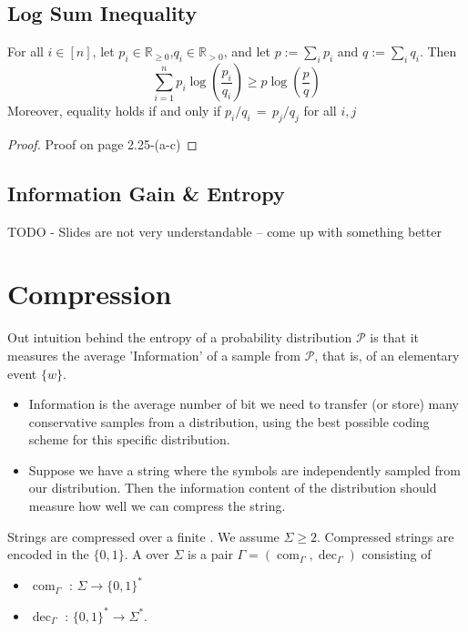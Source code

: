 \subsection{Log Sum Inequality}
For all $ i \in[n]$, let $ p_{i} \in \mathbb{R}_{ \geq 0}$,$ q_{i} \in \mathbb{R}_{>0}$, and let $ p :=\sum_{i} p_{i} $ and $q :=\sum_{i} q_{i}$. Then 
\begin{equation*}
\sum_{i=1}^{n} p_{i} \log (\frac{p_{i}}{q_{i}}) \geq p \log (\frac{p}{q})
\end{equation*}
Moreover, equality holds if and only if $p_i/q_i \, = \, p_j/q_j$ for all $i,j$
\begin{proof}
	Proof on page 2.25-(a-c)
\end{proof}
\subsection{Information Gain \& Entropy}
TODO - Slides are not very understandable -- come up with something better
\section{Compression}
Out intuition behind the entropy of a probability distribution $\mathcal{P}$ is that it measures the average 'Information' of a sample from $\mathcal{P}$, that is, of an elementary event $\{w\}$.
\begin{itemize}
	\item Information is the average number of bit we need to transfer (or store) many conservative samples from a distribution, using the best possible coding scheme for this specific distribution.
	\item Suppose we have a string where the symbols are independently sampled from our distribution. Then the information content of the distribution should measure how well we can compress the string.
\end{itemize}
Strings are compressed over a finite . We assume $\Sigma \geq 2$. Compressed strings are encoded in the  $\{0,1\}$. A  over $\Sigma$ is a pair $\Gamma = (\operatorname{com}_\Gamma,\operatorname{dec}_\Gamma)$ consisting of
\begin{itemize}
	\item {}  $\operatorname{com}_\Gamma\text{ : }\Sigma\rightarrow \{0,1\}^*$ 
	\item {}  $\operatorname{dec}_\Gamma\text{ : }\{0,1\}^* \rightarrow \Sigma^*$.
\end{itemize} 

